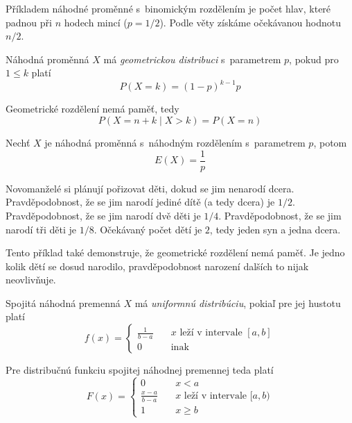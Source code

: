 \begin{example}
    Příkladem náhodné proměnné s~binomickým rozdělením je
    počet hlav, které padnou při $n$ hodech mincí ($p = 1/2$).
    Podle věty získáme očekávanou hodnotu $n/2$.
\end{example}

\begin{definition}
    Náhodná proměnná $X$ má {\em geometrickou distribuci} s~parametrem
    $p$, pokud pro $1 \leq k$ platí
\[
    P(X = k) = (1-p)^{k-1} p
\]
\end{definition}

\begin{claim}
    Geometrické rozdělení nemá paměť, tedy
    \[
        P(X = n + k \mid X > k) = P(X = n)
    \]
\end{claim}

\begin{theorem}
    Nechť $X$ je náhodná proměnná s~náhodným rozdělením s~parametrem
    $p$, potom
    \[
        E(X) = \frac{1}{p}
    \]
\end{theorem}

\begin{example}
    Novomanželé si plánují pořizovat děti, dokud se jim nenarodí dcera.
    Pravděpodobnost, že se jim narodí jediné dítě (a tedy dcera) je $1/2$.
    Pravděpodobnost, že se jim narodí dvě děti je $1/4$.
    Pravděpodobnost, že se jim narodí tři děti je $1/8$.
    Očekávaný počet dětí je $2$, tedy jeden syn a jedna dcera.

    Tento příklad také demonstruje, že geometrické rozdělení nemá paměť.
    Je jedno kolik dětí se dosud narodilo, pravděpodobnost narození
    dalších to nijak neovlivňuje.
\end{example}

\begin{definition}
    Spojitá náhodná premenná $X$ má {\em uniformnú distribúciu},
    pokiaľ pre jej hustotu platí
    \[
        f(x) = 
			\begin{cases}
				\frac{1}{b-a} &\quad x \text{ leží v intervale }[a,b]\\
				0 &\quad\text{inak}
			\end{cases}
    \]
\end{definition}

Pre distribučnú funkciu spojitej náhodnej premennej teda platí
	\[
        F(x) = 
			\begin{cases}
				0 &\quad x < a \\
				\frac{x-a}{b-a} &\quad x \text{ leží v intervale }[a,b)\\
				1 &\quad x \geq b
			\end{cases}
    \]

